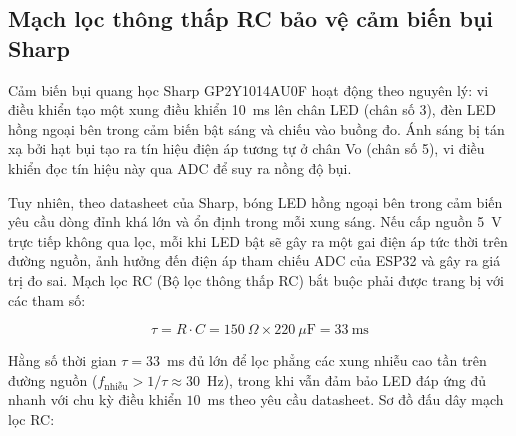 \documentclass[12pt,a4paper]{article}
\begin{document}
\subsection{Mạch lọc thông thấp RC bảo vệ cảm biến bụi Sharp}

Cảm biến bụi quang học Sharp GP2Y1014AU0F hoạt động theo nguyên lý: vi điều khiển tạo một xung điều khiển 10~ms lên chân LED (chân số 3), đèn LED hồng ngoại bên trong cảm biến bật sáng và chiếu vào buồng đo. Ánh sáng bị tán xạ bởi hạt bụi tạo ra tín hiệu điện áp tương tự ở chân Vo (chân số 5), vi điều khiển đọc tín hiệu này qua ADC để suy ra nồng độ bụi.

Tuy nhiên, theo datasheet của Sharp, bóng LED hồng ngoại bên trong cảm biến yêu cầu dòng đỉnh khá lớn và ổn định trong mỗi xung sáng. Nếu cấp nguồn 5~V trực tiếp không qua lọc, mỗi khi LED bật sẽ gây ra một gai điện áp tức thời trên đường nguồn, ảnh hưởng đến điện áp tham chiếu ADC của ESP32 và gây ra giá trị đo sai. Mạch lọc RC (Bộ lọc thông thấp RC) bắt buộc phải được trang bị với các tham số:

\begin{equation}
    \tau = R \cdot C = 150~\Omega \times 220~\mu\text{F} = 33~\text{ms}
    \label{eq:rc_filter}
\end{equation}

Hằng số thời gian $\tau = 33$~ms đủ lớn để lọc phẳng các xung nhiễu cao tần trên đường nguồn ($f_{\text{nhiễu}} > 1/\tau \approx 30$~Hz), trong khi vẫn đảm bảo LED đáp ứng đủ nhanh với chu kỳ điều khiển $10$~ms theo yêu cầu datasheet. Sơ đồ đấu dây mạch lọc RC:
\end{document}
